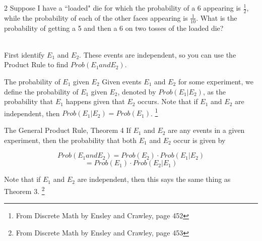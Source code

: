 \documentclass[a4paper,12pt]{book}
\newcounter{question}
\begin{document}
        
        \begin{question}{\thequestion}{2}
            Suppose I have a ``loaded" die for which the probability of a 6
            appearing is $\frac{1}{2}$, while the probability of each of the other faces
            appearing is $\frac{1}{10}$. What is the probability of getting a 5
            and then a 6 on two tosses of the loaded die?

            ~\\
            First identify $E_{1}$ and $E_{2}$. These events are independent,
            so you can use the Product Rule to find $Prob(E_{1} and E_{2})$.

        \end{question}
        
        \begin{intro}{The probability of $E_{1}$ given $E_{2}$}
            Given events $E_{1}$ and $E_{2}$ for some experiment, we
            define the probability of $E_{1}$ given $E_{2}$, denoted by
            $Prob(E_{1} | E_{2})$, as the probability that $E_{1}$ happens
            given that $E_{2}$ occurs. Note that if $E_{1}$ and $E_{2}$
            are independent, then $Prob( E_{1} | E_{2}) = Prob(E_{1})$.
            \footnote{From Discrete Math by Ensley and Crawley, page 452}
        \end{intro}
        
        \newpage

        \begin{intro}{The General Product Rule, Theorem 4}
            If $E_{1}$ and $E_{2}$ are any events in a given experiment, then
            the probability that both $E_{1}$ and $E_{2}$ occur is given by

            $$Prob(E_{1} and E_{2}) = Prob(E_{2}) \cdot Prob(E_{1} | E_{2}) $$
            $$ = Prob(E_{1}) \cdot Prob(E_{2} | E_{1}) $$

            Note that if $E_{1}$ and $E_{2}$ are independent, then this says
            the same thing as Theorem 3.
            \footnote{From Discrete Math by Ensley and Crawley, page 453}
        \end{intro}
        
\end{document}
